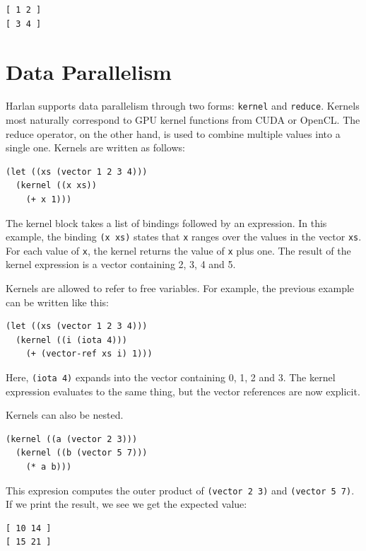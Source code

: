 \documentclass[oneside]{report}
\begin{document}
\begin{verbatim}
[ 1 2 ]
[ 3 4 ]
\end{verbatim}

\section{Data Parallelism}

Harlan supports data parallelism through two forms: \lstinline{kernel}
and \lstinline{reduce}. Kernels most naturally correspond to GPU
kernel functions from CUDA or OpenCL. The reduce operator, on the
other hand, is used to combine multiple values into a single
one. Kernels are written as follows:

\begin{lstlisting}
(let ((xs (vector 1 2 3 4)))
  (kernel ((x xs))
    (+ x 1)))
\end{lstlisting}

The kernel block takes a list of bindings followed by an
expression. In this example, the binding \lstinline{(x xs)} states
that \lstinline{x} ranges over the values in the vector
\lstinline{xs}. For each value of \lstinline{x}, the kernel returns
the value of \lstinline{x} plus one. The result of the kernel
expression is a vector containing 2, 3, 4 and 5.

Kernels are allowed to refer to free variables. For example, the
previous example can be written like this:

\begin{lstlisting}
(let ((xs (vector 1 2 3 4)))
  (kernel ((i (iota 4)))
    (+ (vector-ref xs i) 1)))
\end{lstlisting}

Here, \lstinline{(iota 4)} expands into the vector containing 0, 1, 2
and 3. The kernel expression evaluates to the same thing, but the
vector references are now explicit.

Kernels can also be nested.

\begin{lstlisting}
(kernel ((a (vector 2 3)))
  (kernel ((b (vector 5 7)))
    (* a b)))  
\end{lstlisting}

This expresion computes the outer product of \lstinline{(vector 2 3)}
and \lstinline{(vector 5 7)}. If we print the result, we see we get
the expected value:

\begin{verbatim}
[ 10 14 ]
[ 15 21 ]
\end{verbatim}
\end{document}

